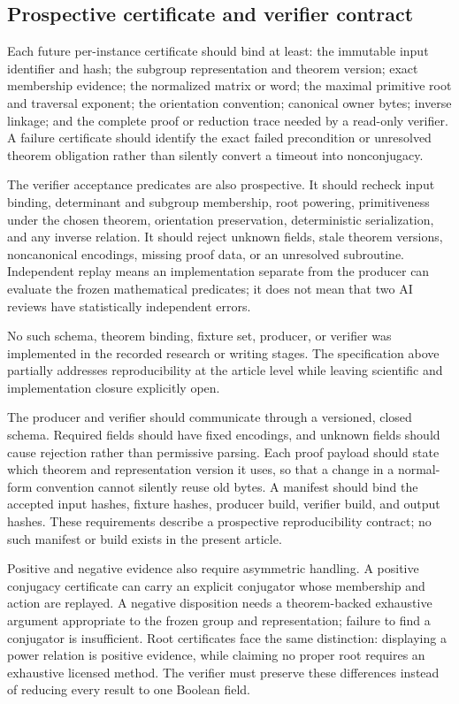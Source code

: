 \documentclass[11pt]{article}
\begin{document}
\hypertarget{42-prospective-certificate-and-verifier-contract}{%
\subsection{Prospective certificate and verifier
contract}\label{42-prospective-certificate-and-verifier-contract}}

Each future per-instance certificate should bind at least: the immutable
input identifier and hash; the subgroup representation and theorem
version; exact membership evidence; the normalized matrix or word; the
maximal primitive root and traversal exponent; the orientation
convention; canonical owner bytes; inverse linkage; and the complete
proof or reduction trace needed by a read-only verifier. A failure
certificate should identify the exact failed precondition or unresolved
theorem obligation rather than silently convert a timeout into
nonconjugacy.

The verifier acceptance predicates are also prospective. It should
recheck input binding, determinant and subgroup membership, root
powering, primitiveness under the chosen theorem, orientation
preservation, deterministic serialization, and any inverse relation. It
should reject unknown fields, stale theorem versions, noncanonical
encodings, missing proof data, or an unresolved subroutine. Independent
replay means an implementation separate from the producer can evaluate
the frozen mathematical predicates; it does not mean that two AI reviews
have statistically independent errors.

No such schema, theorem binding, fixture set, producer, or verifier was
implemented in the recorded research or writing stages. The specification above partially addresses
reproducibility at the article level while leaving scientific and
implementation closure explicitly open.

The producer and verifier should communicate through a versioned,
closed schema. Required fields should have fixed encodings, and unknown
fields should cause rejection rather than permissive parsing. Each proof
payload should state which theorem and representation version it uses,
so that a change in a normal-form convention cannot silently reuse old
bytes. A manifest should bind the accepted input hashes, fixture hashes,
producer build, verifier build, and output hashes. These requirements
describe a prospective reproducibility contract; no such manifest or
build exists in the present article.

Positive and negative evidence also require asymmetric handling. A
positive conjugacy certificate can carry an explicit conjugator whose
membership and action are replayed. A negative disposition needs a
theorem-backed exhaustive argument appropriate to the frozen group and
representation; failure to find a conjugator is insufficient. Root
certificates face the same distinction: displaying a power relation is
positive evidence, while claiming no proper root requires an exhaustive
licensed method. The verifier must preserve these differences instead
of reducing every result to one Boolean field.
\end{document}
